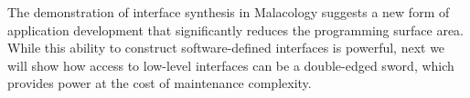 The demonstration of interface synthesis in Malacology suggests a new form of
application development that significantly reduces the programming surface
area. While this ability to construct software-defined interfaces is powerful,
next we will show how access to low-level interfaces can be a double-edged
sword, which provides power at the cost of maintenance complexity.
